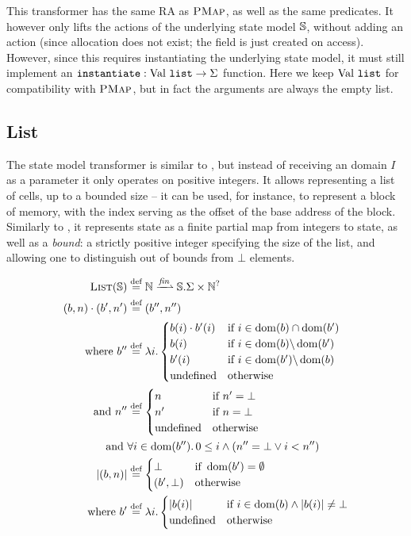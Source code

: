 This transformer has the same RA as $\textsc{PMap}$, as well as the same predicates. It however only lifts the actions of the underlying state model $\mathbb S$, without adding an \alloc{} action (since allocation does not exist; the field is just created on access). However, since this requires instantiating the underlying state model, it must still implement an ${\texttt{instantiate}: \text{Val}~\texttt{list} \rightarrow \Sigma}$ function. Here we keep $\text{Val}~\texttt{list}$ for compatibility with $\textsc{PMap}$, but in fact the arguments are always the empty list.

\subsection{List}

The \List{} state model transformer is similar to \PMap, but instead of receiving an domain $I$ as a parameter it only operates on positive integers. It allows representing a list of cells, up to a bounded size -- it can be used, for instance, to represent a block of memory, with the index serving as the offset of the base address of the block. Similarly to \PMap{}, it represents state as a finite partial map from integers to state, as well as a \emph{bound}: a strictly positive integer specifying the size of the list, and allowing one to distinguish out of bounds from $\bot$ elements.

\begin{align*}
	\List(\mmdl) &\defeq \nats \finmap \mmdl.\Sigma \times \nats^?\\
	(b,n)\cdot (b',n') &\defeq (b'', n'')\\
	\text{where } b''&\defeq \lambda i.\begin{cases}
		b(i)\cdot b'(i)&\If~i\in \dom(b)\cap\dom(b')\\
		b(i) &\If~i\in \dom(b) \backslash \dom(b')\\
		b'(i) &\If~i\in \dom(b') \backslash \dom(b)\\
		\text{undefined}&\Otherwise
	\end{cases}\\
	\text{and }n''&\defeq\begin{cases}
		n&\If~n'=\bot\\
		n'&\If~n=\bot\\
		\text{undefined}&\Otherwise
	\end{cases}\\
	\text{and }& \forall i\in\dom(b'')\ldotp 0\leq i \land (n'' = \bot \lor i < n'')\\
	|(b, n)| &\defeq \begin{cases}
		\bot &\If~\dom(b')=\emptyset\\
		(b',\bot) &\Otherwise
	\end{cases}\\
	\text{where }b'&\defeq\lambda i.\begin{cases}
		|b(i)| &\If~ i\in\dom(b) \land |b(i)| \neq \bot\\
		\text{undefined} &\Otherwise
	\end{cases}
\end{align*}

